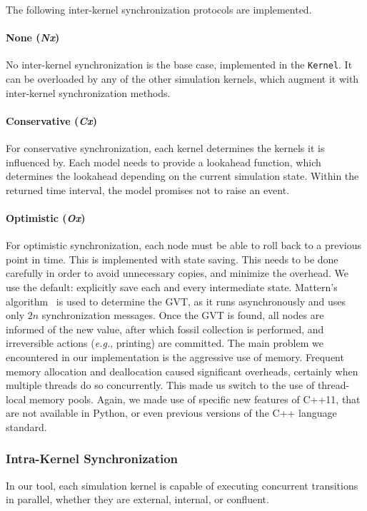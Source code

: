 The following inter-kernel synchronization protocols are implemented.

\paragraph{None (\textit{Nx})}
No inter-kernel synchronization is the base case, implemented in the \texttt{Kernel}.
It can be overloaded by any of the other simulation kernels, which augment it with inter-kernel synchronization methods.

\paragraph{Conservative (\textit{Cx})}
For conservative synchronization, each kernel determines the kernels it is influenced by.
Each model needs to provide a lookahead function, which determines the lookahead depending on the current simulation state.
Within the returned time interval, the model promises not to raise an event.

\paragraph{Optimistic (\textit{Ox})}
For optimistic synchronization, each node must be able to roll back to a previous point in time.
This is implemented with state saving.
This needs to be done carefully in order to avoid unnecessary copies, and minimize the overhead.
We use the default: explicitly save each and every intermediate state.
Mattern's algorithm~\cite{mattern} is used to determine the GVT, as it runs asynchronously and uses only $2n$ synchronization messages.
Once the GVT is found, all nodes are informed of the new value, after which fossil collection is performed, and irreversible actions (\textit{e.g.}, printing) are committed.
The main problem we encountered in our implementation is the aggressive use of memory.
Frequent memory allocation and deallocation caused significant overheads, certainly when multiple threads do so concurrently.
This made us switch to the use of thread-local %
 memory pools.
Again, we made use of specific new features of C++11, that are not available in Python, or even previous versions of the C++ language standard.

\subsubsection{Intra-Kernel Synchronization}
In our tool, each simulation kernel is capable of executing concurrent transitions in parallel, whether they are external, internal, or confluent.

